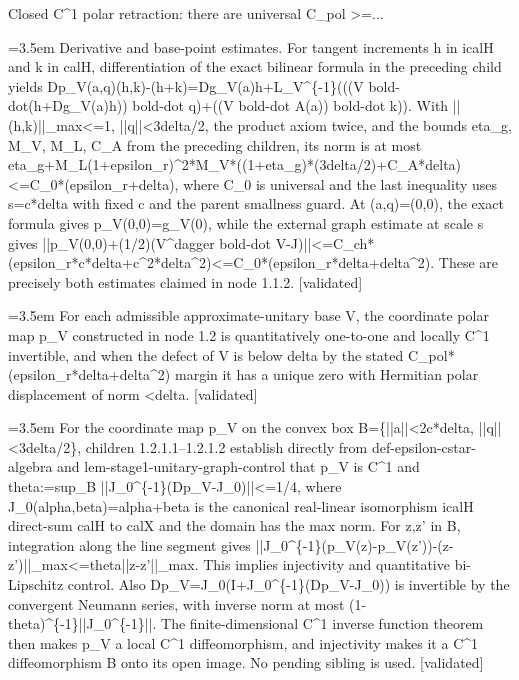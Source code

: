 \documentclass{article}
\newcommand{\step}[1]{\par\noindent\hangindent=3.5em\hangafter=1%
  \makebox[3.5em][l]{\textbf{#1.}}}
\newcommand{\steptag}[1]{\hfill{\small\textsf{[#1]}}}
\begin{document}
\begin{proofbox}{Closed C\textasciicircum{}1 polar retraction: there are universal C\_pol >=...}
\step{1.1.2.3} Derivative and base-point estimates. For tangent increments h in icalH and k in calH, differentiation of the exact bilinear formula in the preceding child yields Dp\_V(a,q)(h,k)-(h+k)=Dg\_V(a)h+L\_V\textasciicircum{}\{-1\}(((V bold-dot(h+Dg\_V(a)h)) bold-dot q)+((V bold-dot A(a)) bold-dot k)). With ||(h,k)||\_max<=1, ||q||<3delta/2, the product axiom twice, and the bounds eta\_g, M\_V, M\_L, C\_A from the preceding children, its norm is at most eta\_g+M\_L(1+epsilon\_r)\textasciicircum{}2*M\_V*((1+eta\_g)*(3delta/2)+C\_A*delta)<=C\_0*(epsilon\_r+delta), where C\_0 is universal and the last inequality uses s=c*delta with fixed c and the parent smallness guard. At (a,q)=(0,0), the exact formula gives p\_V(0,0)=g\_V(0), while the external graph estimate at scale s gives ||p\_V(0,0)+(1/2)(V\textasciicircum{}dagger bold-dot V-J)||<=C\_ch*(epsilon\_r*c*delta+c\textasciicircum{}2*delta\textasciicircum{}2)<=C\_0*(epsilon\_r*delta+delta\textasciicircum{}2). These are precisely both estimates claimed in node 1.1.2. \steptag{validated} \\[4pt]
\step{1.2} For each admissible approximate-unitary base V, the coordinate polar map p\_V constructed in node 1.2 is quantitatively one-to-one and locally C\textasciicircum{}1 invertible, and when the defect of V is below delta by the stated C\_pol*(epsilon\_r*delta+delta\textasciicircum{}2) margin it has a unique zero with Hermitian polar displacement of norm <delta. \steptag{validated} \\[6pt]
\step{1.2.1} For the coordinate map p\_V on the convex box B=\{||a||<2c*delta, ||q||<3delta/2\}, children 1.2.1.1--1.2.1.2 establish directly from def-epsilon-cstar-algebra and lem-stage1-unitary-graph-control that p\_V is C\textasciicircum{}1 and theta:=sup\_B ||J\_0\textasciicircum{}\{-1\}(Dp\_V-J\_0)||<=1/4, where J\_0(alpha,beta)=alpha+beta is the canonical real-linear isomorphism icalH direct-sum calH to calX and the domain has the max norm. For z,z' in B, integration along the line segment gives ||J\_0\textasciicircum{}\{-1\}(p\_V(z)-p\_V(z'))-(z-z')||\_max<=theta||z-z'||\_max. This implies injectivity and quantitative bi-Lipschitz control. Also Dp\_V=J\_0(I+J\_0\textasciicircum{}\{-1\}(Dp\_V-J\_0)) is invertible by the convergent Neumann series, with inverse norm at most (1-theta)\textasciicircum{}\{-1\}||J\_0\textasciicircum{}\{-1\}||. The finite-dimensional C\textasciicircum{}1 inverse function theorem then makes p\_V a local C\textasciicircum{}1 diffeomorphism, and injectivity makes it a C\textasciicircum{}1 diffeomorphism B onto its open image. No pending sibling is used. \steptag{validated} \\[6pt]

\end{proofbox}
\end{document}
